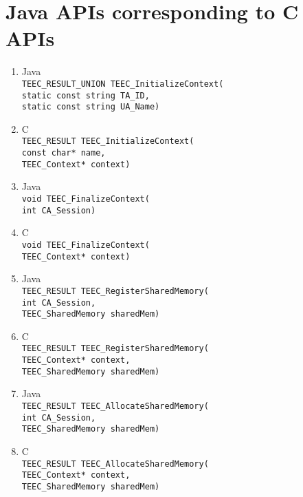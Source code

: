 \documentclass{cseminar}
\begin{document}
\section{Java APIs corresponding to C APIs}
\begin{enumerate}


	\item Java\\
				\texttt{TEEC\_RESULT\_UNION TEEC\_InitializeContext(
				\\static const string TA\_ID,
				\\static const string UA\_Name)
				}
	\item[] C 
				\\\texttt{TEEC\_RESULT TEEC\_InitializeContext(
				\\const char* name,
				\\TEEC\_Context* context)
				}


	\item Java\\
				\texttt{void TEEC\_FinalizeContext(
				\\int CA\_Session)
				}
	\item[] C\\
				\texttt{void TEEC\_FinalizeContext(
				\\TEEC\_Context* context)
				}

	\item Java\\
				\texttt{TEEC\_RESULT TEEC\_RegisterSharedMemory(
				\\int CA\_Session,
				\\TEEC\_SharedMemory sharedMem)
				}
	\item[] C\\
				\texttt{TEEC\_RESULT TEEC\_RegisterSharedMemory(
				\\TEEC\_Context* context,
				\\TEEC\_SharedMemory sharedMem)
				}

	\item Java\\
				\texttt{TEEC\_RESULT TEEC\_AllocateSharedMemory(
				\\int CA\_Session,
				\\TEEC\_SharedMemory sharedMem)
				}
	\item[] C\\
				\texttt{TEEC\_RESULT TEEC\_AllocateSharedMemory(
				\\TEEC\_Context* context,
				\\TEEC\_SharedMemory sharedMem)
				}



\end{enumerate}
\end{document}
